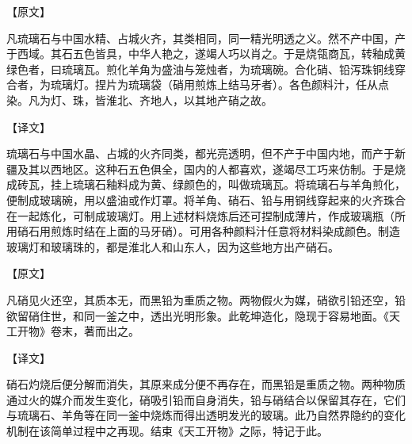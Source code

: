 \documentclass[12pt,UTF8]{ctexbook}
\begin{document}
【原文】

凡琉璃石与中国水精、占城火齐，其类相同，同一精光明透之义。然不产中国，产于西域。其石五色皆具，中华人艳之，遂竭人巧以肖之。于是烧瓴商瓦，转釉成黄绿色者，曰琉璃瓦。煎化羊角为盛油与笼烛者，为琉璃碗。合化硝、铅泻珠铜线穿合者，为琉璃灯。捏片为琉璃袋（硝用煎炼上结马牙者）。各色颜料汁，任从点染。凡为灯、珠，皆淮北、齐地人，以其地产硝之故。

【译文】

琉璃石与中国水晶、占城的火齐同类，都光亮透明，但不产于中国内地，而产于新疆及其以西地区。这种石五色俱全，国内的人都喜欢，遂竭尽工巧来仿制。于是烧成砖瓦，挂上琉璃石釉料成为黄、绿颜色的，叫做琉璃瓦。将琉璃石与羊角煎化，便制成玻璃碗，用以盛油或作灯罩。将羊角、硝石、铅与用铜线穿起来的火齐珠合在一起炼化，可制成玻璃灯。用上述材料烧炼后还可捏制成薄片，作成玻璃瓶（所用硝石用煎炼时结在上面的马牙硝）。可用各种颜料汁任意将材料染成颜色。制造玻璃灯和玻璃珠的，都是淮北人和山东人，因为这些地方出产硝石。

【原文】

凡硝见火还空，其质本无，而黑铅为重质之物。两物假火为媒，硝欲引铅还空，铅欲留硝住世，和同一釜之中，透出光明形象。此乾坤造化，隐现于容易地面。《天工开物》卷末，著而出之。

【译文】

硝石灼烧后便分解而消失，其原来成分便不再存在，而黑铅是重质之物。两种物质通过火的媒介而发生变化，硝吸引铅而自身消失，铅与硝结合以保留其存在，它们与琉璃石、羊角等在同一釜中烧炼而得出透明发光的玻璃。此乃自然界隐约的变化机制在该简单过程中之再现。结束《天工开物》之际，特记于此。


\backmatter
\end{document}
